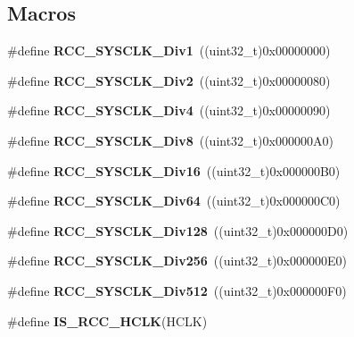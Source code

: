 \subsection*{Macros}
\begin{DoxyCompactItemize}
\item 
\mbox{\label{group___r_c_c___a_h_b___clock___source_gadc3ac37d90c2082d640e5948fac0878f}} 
\#define {\bfseries R\+C\+C\+\_\+\+S\+Y\+S\+C\+L\+K\+\_\+\+Div1}~((uint32\+\_\+t)0x00000000)
\item 
\mbox{\label{group___r_c_c___a_h_b___clock___source_gacadd82156776154a07d128b454fc69fd}} 
\#define {\bfseries R\+C\+C\+\_\+\+S\+Y\+S\+C\+L\+K\+\_\+\+Div2}~((uint32\+\_\+t)0x00000080)
\item 
\mbox{\label{group___r_c_c___a_h_b___clock___source_ga458f8ae63164e878930dbebd7643f087}} 
\#define {\bfseries R\+C\+C\+\_\+\+S\+Y\+S\+C\+L\+K\+\_\+\+Div4}~((uint32\+\_\+t)0x00000090)
\item 
\mbox{\label{group___r_c_c___a_h_b___clock___source_gade72fe3aca89f3e8c4fe8692ea217912}} 
\#define {\bfseries R\+C\+C\+\_\+\+S\+Y\+S\+C\+L\+K\+\_\+\+Div8}~((uint32\+\_\+t)0x000000\+A0)
\item 
\mbox{\label{group___r_c_c___a_h_b___clock___source_gaefd8df4be9c9dbd9cebfb2384933500a}} 
\#define {\bfseries R\+C\+C\+\_\+\+S\+Y\+S\+C\+L\+K\+\_\+\+Div16}~((uint32\+\_\+t)0x000000\+B0)
\item 
\mbox{\label{group___r_c_c___a_h_b___clock___source_gab6a2c2d4e945c607259988a9b6df26e5}} 
\#define {\bfseries R\+C\+C\+\_\+\+S\+Y\+S\+C\+L\+K\+\_\+\+Div64}~((uint32\+\_\+t)0x000000\+C0)
\item 
\mbox{\label{group___r_c_c___a_h_b___clock___source_ga1a28926fcb86112058a365e01fe9a46b}} 
\#define {\bfseries R\+C\+C\+\_\+\+S\+Y\+S\+C\+L\+K\+\_\+\+Div128}~((uint32\+\_\+t)0x000000\+D0)
\item 
\mbox{\label{group___r_c_c___a_h_b___clock___source_gaa28bb876893b3267a813fc98a462d5ee}} 
\#define {\bfseries R\+C\+C\+\_\+\+S\+Y\+S\+C\+L\+K\+\_\+\+Div256}~((uint32\+\_\+t)0x000000\+E0)
\item 
\mbox{\label{group___r_c_c___a_h_b___clock___source_gab5b4588c455d6327bc96f131ed6698ab}} 
\#define {\bfseries R\+C\+C\+\_\+\+S\+Y\+S\+C\+L\+K\+\_\+\+Div512}~((uint32\+\_\+t)0x000000\+F0)
\item 
\#define {\bfseries I\+S\+\_\+\+R\+C\+C\+\_\+\+H\+C\+LK}(H\+C\+LK)
\end{DoxyCompactItemize}


